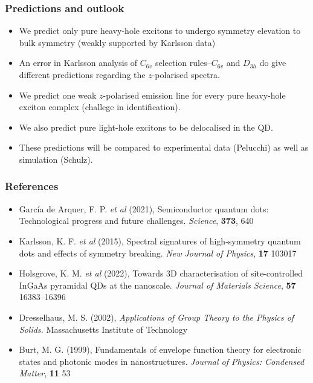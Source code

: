 \documentclass[english]{beamer}
\begin{document}
  \begin{frame}
  	\frametitle{Predictions and outlook}
  	\begin{itemize}
  		\item We predict only pure heavy-hole excitons to undergo symmetry elevation to bulk symmetry (weakly supported by Karlsson data)
  		\item An error in Karlsson analysis of $C_{6v}$ selection rules--$C_{6v}$ and $D_{3h}$ do give different predictions regarding the $z$-polarised spectra.
  		\item We predict one weak $z$-polarised emission line for every pure heavy-hole exciton complex (challege in identification).
  		\item We also predict pure light-hole excitons to be delocalised in the QD.
  		\item These predictions will be compared to experimental data (Pelucchi) as well as simulation (Schulz).
  	\end{itemize}
  \end{frame}
  
  \begin{frame}
  	\frametitle{References}
  	\begin{itemize}
  		\item García de Arquer, F. P. \textit{et al} (2021), Semiconductor quantum dots: Technological progress
and future challenges. \textit{Science}, \textbf{373}, 640
		\item Karlsson, K. F. \textit{et al} (2015), Spectral signatures of high-symmetry quantum dots and effects of symmetry breaking. \textit{New Journal of Physics}, \textbf{17} 103017
		\item Holsgrove, K. M. \textit{et al} (2022), Towards 3D characterisation of site-controlled InGaAs pyramidal QDs at the nanoscale. \textit{Journal of Materials Science}, \textbf{57} 16383--16396
		\item Dresselhaus, M. S. (2002), \textit{Applications of Group Theory to the Physics of Solids.} Massachusetts Institute of Technology
		\item Burt, M. G. (1999), Fundamentals of envelope function theory for electronic states and photonic modes in nanostructures. \textit{Journal of Physics: Condensed Matter}, \textbf{11} 53
  	\end{itemize}
  
  \end{frame}
  
\end{document}
